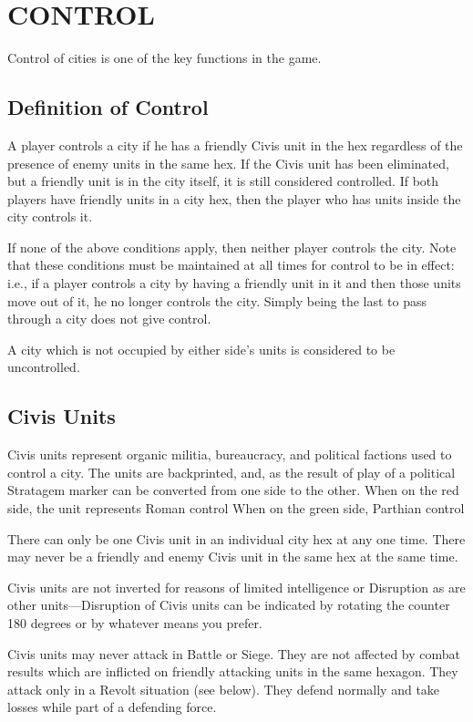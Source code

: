 \section{CONTROL}

Control of cities is one of the key functions in the game.

\subsection{Definition of Control}

A player controls a city if he has a friendly Civis unit in the hex regardless of the presence of enemy units in the same hex. If the Civis unit has been eliminated, but a friendly unit is in the city itself, it is still considered controlled. If both players have friendly units in a city hex, then the player who has units inside the city controls it.

If none of the above conditions apply, then neither player controls the city. Note that these conditions must be maintained at all times for control to be in effect: i.e., if a player controls a city by having a friendly unit in it and then those units move out of it, he no longer controls the city. Simply being the last to pass through a city does not give control.

A city which is not occupied by either side's units is considered to be uncontrolled.

\subsection{Civis Units}

Civis units represent organic militia, bureaucracy, and political factions used to control a city. The units are backprinted, and, as the result of play of a political Stratagem marker can be converted from one side to the other. When on the red side, the unit represents Roman control When on the green side, Parthian control

There can only be one Civis unit in an individual city hex at any one time. There may never be a friendly and enemy Civis unit in the same hex at the same time.

Civis units are not inverted for reasons of limited intelligence or Disruption as are other units—Disruption of Civis units can be indicated by rotating the counter 180 degrees or by whatever means you prefer.

Civis units may never attack in Battle or Siege. They are not affected by combat results which are inflicted on friendly attacking units in the same hexagon. They attack only in a Revolt situation (see below). They defend normally and take losses while part of a defending force.

